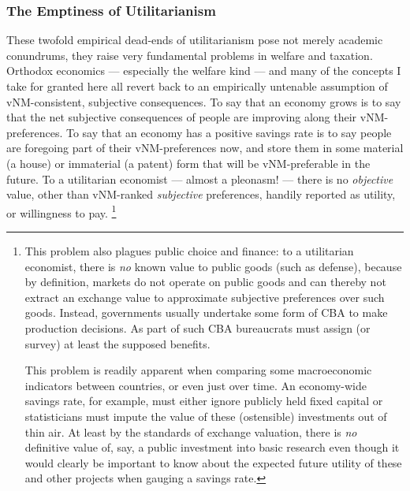 \subsubsection[Emptiness]{The Emptiness of Utilitarianism}
	\label{sec:emptiness}
These twofold empirical dead-ends of utilitarianism pose not merely academic conundrums, they raise very fundamental problems in welfare and taxation.
Orthodox economics --- especially the welfare kind --- and many of the concepts I take for granted here all revert back to an empirically untenable assumption of \gls{vNM}-consistent, subjective consequences.
To say that an economy grows is to say that the net subjective consequences of people are improving along their \gls{vNM}-preferences.
To say that an economy has a positive savings rate is to say people are foregoing part of their \gls{vNM}-preferences now, and store them in some material (a house) or immaterial (a patent) form that will be \gls{vNM}-preferable in the future.
To a utilitarian economist --- almost a pleonasm! --- there is no \emph{objective} value, other than \gls{vNM}-ranked \emph{subjective} preferences, handily reported as utility, or willingness to pay.
\footnote{
	This problem also plagues public choice and finance:
	to a utilitarian economist, there is \emph{no} known value to public goods (such as defense), because by definition, markets do not operate on public goods and can thereby not extract an exchange value to approximate subjective preferences over such goods.
	Instead, governments usually undertake some form of \gls{CBA} to make production decisions.
	As part of such \gls{CBA} bureaucrats must assign (or survey) at least the supposed benefits.

	This problem is readily apparent when comparing some macroeconomic indicators between countries, or even just over time.
	An economy-wide savings rate, for example, must either ignore publicly held fixed capital %
	or statisticians must impute the value of these (ostensible) investments out of thin air.
	At least by the standards of exchange valuation, there is \emph{no} definitive value of, say, a public investment into basic research even though it would clearly be important to know about the expected future utility of these and other projects when gauging a savings rate.
}
